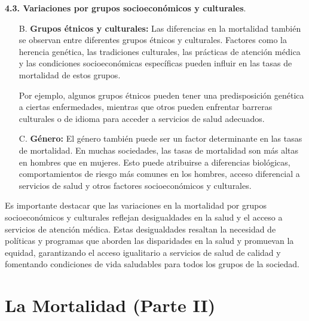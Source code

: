 \documentclass[8pt,a4paper]{beamer}
\begin{document}
{\begin{frame}{}
\begin{block}{\textbf{4.3. Variaciones por grupos socioeconómicos y culturales}.}
\begin{enumerate}
\item[B.] \textbf{Grupos étnicos y culturales:} Las diferencias en la mortalidad también se observan entre diferentes grupos étnicos y culturales. Factores como la herencia genética, las tradiciones culturales, las prácticas de atención médica y las condiciones socioeconómicas específicas pueden influir en las tasas de mortalidad de estos grupos.

\end{enumerate}
\end{block}
\end{frame}


\begin{frame}{}
\setlength{\parskip}{3px}
\justifying
\begin{block}{}
\setlength{\parskip}{3px}
\justifying
\begin{enumerate}
\setlength{\parskip}{3px}
\justifying

\item[{}] Por ejemplo, algunos grupos étnicos pueden tener una predisposición genética a ciertas enfermedades, mientras que otros pueden enfrentar barreras culturales o de idioma para acceder a servicios de salud adecuados.

\item[C.] \textbf{Género:} El género también puede ser un factor determinante en las tasas de mortalidad. En muchas sociedades, las tasas de mortalidad son más altas en hombres que en mujeres. Esto puede atribuirse a diferencias biológicas, comportamientos de riesgo más comunes en los hombres, acceso diferencial a servicios de salud y otros factores socioeconómicos y culturales.

\end{enumerate}
Es importante destacar que las variaciones en la mortalidad por grupos socioeconómicos y culturales reflejan desigualdades en la salud y el acceso a servicios de atención médica. Estas desigualdades resaltan la necesidad de políticas y programas que aborden las disparidades en la salud y promuevan la equidad, garantizando el acceso igualitario a servicios de salud de calidad y fomentando condiciones de vida saludables para todos los grupos de la sociedad.
\end{block}
\end{frame}


\section{La Mortalidad (Parte II)}
}
\end{document}
